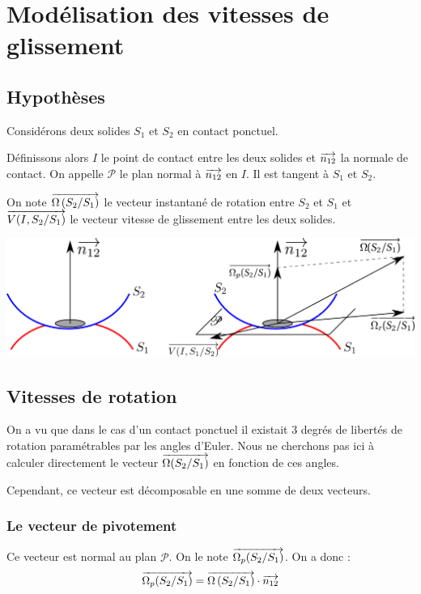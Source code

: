\documentclass[10pt,oneside]{article}
\begin{document}
\section{Modélisation des vitesses de glissement}
\subsection{Hypothèses}
Considérons deux solides $S_1$ et $S_2$ en contact ponctuel. 

Définissons alors $I$ le point de contact entre les deux solides et $\overrightarrow{n_{12}}$ la normale de contact. On appelle $\mathcal{P}$ le plan normal à $\overrightarrow{n_{12}}$ en $I$. Il est tangent à $S_1$ et $S_2$. 

On note $\overrightarrow{\Omega\left( {S_2}/{S_1}\right)}$ le vecteur instantané de rotation entre $S_2$ et $S_1$ et $\overrightarrow{V(I,S_2/S_1)}$ le vecteur vitesse de glissement entre les deux solides.


\begin{center}
\includegraphics[width=.8\textwidth]{png/ContactReel} 
\end{center}

\subsection{Vitesses de rotation}
On a vu que dans le cas d'un contact ponctuel il existait 3 degrés de libertés de rotation paramétrables par les angles d'Euler. Nous ne cherchons pas ici à calculer directement le vecteur $\overrightarrow{\Omega(S_2/S_1)}$ en fonction de ces angles.

Cependant, ce vecteur est décomposable en une somme de deux vecteurs.
\subsubsection*{Le vecteur de pivotement}
Ce vecteur est normal au plan $\mathcal{P}$. On le note $\overrightarrow{\Omega_p(S_2/S_1)}$. On a donc :
$$
\overrightarrow{\Omega_p(S_2/S_1)} = \overrightarrow{\Omega\left( {S_2}/{S_1}\right)}\cdot \overrightarrow{n_{12}}
$$
\end{document}
